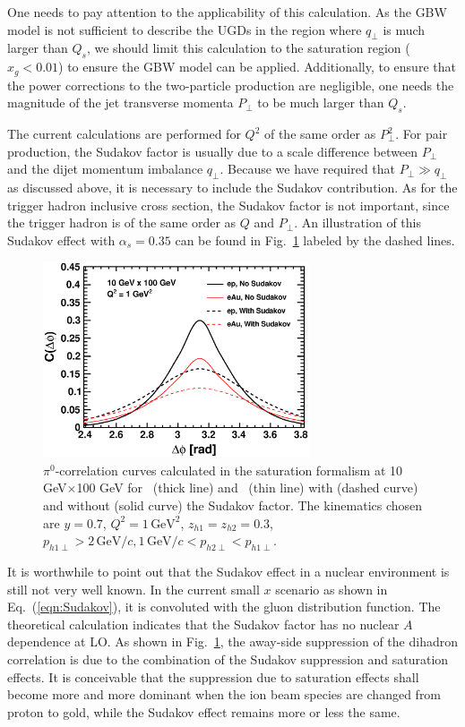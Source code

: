 One needs to pay attention to the applicability of this calculation.
As the GBW model is not sufficient to describe the UGDs in the region where 
$q_{\perp}$ is much larger than $Q_s$, we should limit this calculation to the
saturation region ($x_g<0.01$) to ensure the GBW model
can be applied. Additionally, to ensure that the power corrections to the
two-particle production are negligible, one needs the magnitude of the jet
transverse momenta $P_{\perp}$ to be much larger than $Q_s$.

The current calculations are performed for $Q^2$ of the same order as
$P^2_{\perp}$. For pair production, the Sudakov factor is usually due to
a scale difference between $P_{\perp}$ and the dijet momentum imbalance $q_{\perp}$.
Because we have required that $P_{\perp}\gg q_{\perp}$ as discussed above, it is
necessary to include the Sudakov contribution.  As for the trigger hadron
inclusive cross section, the Sudakov factor is not important, since the trigger
hadron \pt is of the same order as $Q$ and $P_\perp$. An illustration of
this Sudakov effect with $\alpha_s=0.35$ can be found in
Fig.~\ref{fig:dihadron_theory_sud} labeled by the dashed lines.
\begin{figure}
\centering
\includegraphics[width=0.7\textwidth]{plots/chpt6/theory_10x100_y_0.7_deltaphi_Sud_as_0.35.eps} 
\caption[Theoretical predictions of dihadron correlation function based on the saturation model with and without Sudakov factor] {
$\pi^0$-correlation curves calculated in the saturation formalism at 10
GeV$\times $100 GeV for \ep\ (thick line) and \eAu\ (thin line) with (dashed
curve) and without (solid curve) the Sudakov factor. The kinematics chosen are
$y=0.7$, $Q^2=1 \, \textrm{GeV}^2$, $z_{h1}=z_{h2}=0.3$, $p_{h1\perp}>2 \,
\mathrm{GeV}/c,1 \, \mathrm{GeV}/c<p_{h2\perp}<p_{h1\perp}$.
\label{fig:dihadron_theory_sud}
}    
\end{figure}
It is worthwhile to point out that the Sudakov effect in a nuclear environment
is still not very well known. In the current small $x$ scenario as shown in
Eq.~(\ref{eqn:Sudakov}), it is convoluted with the gluon distribution function.
The theoretical calculation indicates that the Sudakov factor has no nuclear
$A$ dependence at LO. As shown in Fig.~\ref{fig:dihadron_theory_sud}, the away-side 
suppression of the dihadron correlation is due to the combination of the
Sudakov suppression and saturation effects. It is conceivable that the
suppression due to saturation effects shall become more and more dominant when
the ion beam species are changed from proton to gold, while the Sudakov effect
remains more or less the same. 


